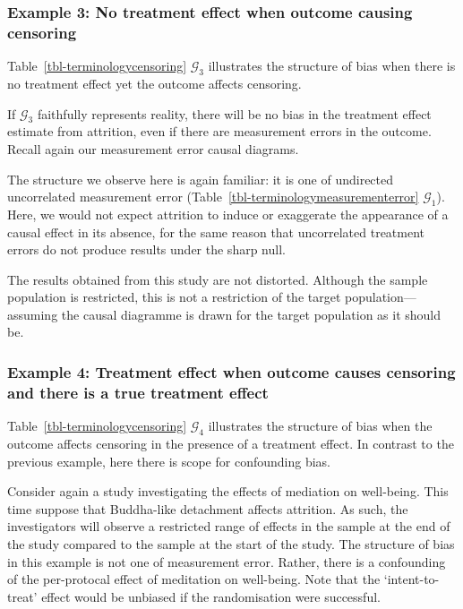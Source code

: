 \documentclass[
  single column]{article}
\begin{document}
\subsubsection{Example 3: No treatment effect when outcome causing
censoring}\label{example-3-no-treatment-effect-when-outcome-causing-censoring}

Table~\ref{tbl-terminologycensoring} \(\mathcal{G}_3\) illustrates the
structure of bias when there is no treatment effect yet the outcome
affects censoring.

If \(\mathcal{G}_3\) faithfully represents reality, there will be no
bias in the treatment effect estimate from attrition, even if there are
measurement errors in the outcome. Recall again our measurement error
causal diagrams.

The structure we observe here is again familiar: it is one of undirected
uncorrelated measurement error
(Table~\ref{tbl-terminologymeasurementerror} \(\mathcal{G}_1\)). Here,
we would not expect attrition to induce or exaggerate the appearance of
a causal effect in its absence, for the same reason that uncorrelated
treatment errors do not produce results under the sharp null.

The results obtained from this study are not distorted. Although the
sample population is restricted, this is not a restriction of the target
population---assuming the causal diagramme is drawn for the target
population as it should be.

\subsubsection{Example 4: Treatment effect when outcome causes censoring
and there is a true treatment
effect}\label{example-4-treatment-effect-when-outcome-causes-censoring-and-there-is-a-true-treatment-effect}

Table~\ref{tbl-terminologycensoring} \(\mathcal{G}_4\) illustrates the
structure of bias when the outcome affects censoring in the presence of
a treatment effect. In contrast to the previous example, here there is
scope for confounding bias.

Consider again a study investigating the effects of mediation on
well-being. This time suppose that Buddha-like detachment affects
attrition. As such, the investigators will observe a restricted range of
effects in the sample at the end of the study compared to the sample at
the start of the study. The structure of bias in this example is not one
of measurement error. Rather, there is a confounding of the per-protocal
effect of meditation on well-being. Note that the `intent-to-treat'
effect would be unbiased if the randomisation were successful.
\end{document}
